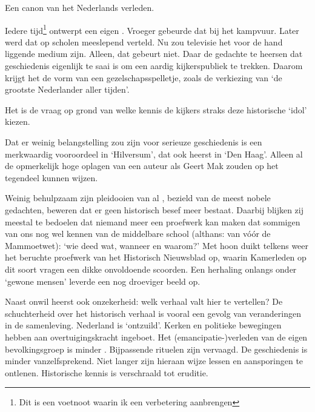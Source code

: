 \documentclass[12pt]{memoir}
\begin{document}
Een canon van het Nederlands verleden.

Iedere tijd\footnote{Dit is een voetnoot waarin ik een verbetering
 aanbrengen} ontwerpt een eigen .
Vroeger gebeurde dat bij het kampvuur. Later werd dat op scholen meeslepend
verteld. Nu zou televisie het voor de hand liggende medium zijn. Alleen, dat
gebeurt niet. Daar  de gedachte te heersen dat geschiedenis
eigenlijk te saai is om een aardig kijkerspubliek te trekken. Daarom krijgt het
de vorm van een gezelschaps\del{ }spelletje, zoals de verkiezing van `de
grootste Nederlander aller tijden'.

Het is de vraag op grond van welke kennis de kijkers straks deze historische
`idol' kiezen. 


Dat er weinig belangstelling zou zijn voor serieuze geschiedenis is een
merkwaardig vooroordeel in `Hilversum', dat ook heerst in `Den Haag'. Alleen al
de opmerkelijk hoge oplagen van een auteur als Geert Mak zouden op het tegendeel
kunnen wijzen.

\begin{minipage}{100mm}
Weinig behulpzaam zijn pleidooien van al , bezield van de
meest nobele gedachten, beweren dat er geen historisch besef meer bestaat.
Daarbij blijken zij meestal te bedoelen dat niemand meer een proefwerk kan maken
dat sommigen van ons nog wel kennen van de middelbare school (althans: van
v\'o\'or de Mammoetwet): `wie deed wat, wanneer en waarom?' Met hoon duikt
telkens weer het beruchte proefwerk van het Historisch Nieuwsblad op, waarin
Kamerleden op dit soort vragen een dikke onvoldoende scoorden. Een herhaling
onlangs onder `gewone mensen' leverde een nog droeviger beeld op.

\end{minipage}

Naast onwil heerst ook onzekerheid: welk verhaal valt hier te vertellen? De
schuchterheid over het historisch verhaal is vooral een gevolg van veranderingen
in de samenleving. Nederland is `ontzuild'. Kerken en politieke bewegingen
hebben aan overtuigingskracht ingeboet. Het (emancipatie-)verleden van de eigen
bevolkingsgroep is minder .
Bijpassende rituelen zijn vervaagd. De geschiedenis is minder vanzelfsprekend.
Niet langer zijn hieraan wijze lessen en aansporingen te ontlenen. Historische
kennis is verschraald tot eruditie.
\end{document}
